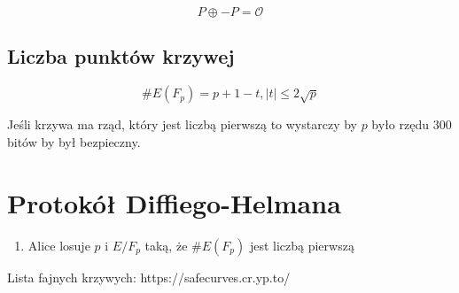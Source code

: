 \documentclass{report}
\begin{document}
$$P \oplus -P = \mathcal{O}$$

\subsection{Liczba punktów krzywej}

$$
\#E(F_p) = p + 1 - t, |t| \leq 2\sqrt{p}
$$

Jeśli krzywa ma rząd, który jest liczbą pierwszą to wystarczy by $p$ było rzędu 300 bitów by był bezpieczny.

\section{Protokół Diffiego-Helmana}

\begin{enumerate}
	\item Alice losuje $p$ i $E/F_p$ taką, że $\#E(F_p)$ jest liczbą pierwszą
\end{enumerate}

Lista fajnych krzywych: https://safecurves.cr.yp.to/
\end{document}
